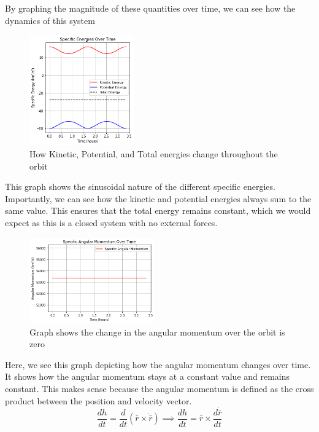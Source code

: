 \documentclass[12pt,twocolumn]{article}  %
\begin{document}
By graphing the magnitude of these quantities over time, we can see how the dynamics of this system
\vspace{0.2cm}
\begin{figure}[H]
    \centering
    \includegraphics[width=0.4\textwidth]{Images/124-energies.png}
    \caption{How Kinetic, Potential, and Total energies change throughout the orbit }
\end{figure}

This graph shows the sinusoidal nature of the different specific energies. Importantly, we can see how the 
kinetic and potential energies always sum to the same value. This ensures that the total energy remains constant, which we would expect 
as this is a closed system with no external forces. 

\begin{figure}[H]
    \centering
    \includegraphics[width=0.48\textwidth]{Images/124-L.png}
    \caption{Graph shows the change in the angular momentum over the orbit is zero}
\end{figure}
\noindent Here, we see this graph depicting how the angular momentum changes over time. It shows how the angular momentum stays 
at a constant value and remains constant. This makes sense because the angular momentum is defined as the cross product
between the position and velocity vector.
\setcounter{equation}{0}
\begin{equation}
\frac{dh}{dt} = \frac{d}{dt}(\bar{r} \times \dot{\bar{r}}) \implies \frac{dh}{dt} = \bar{r} \times \frac{d\dot{\bar{r}}}{dt}
\end{equation}
\end{document}
